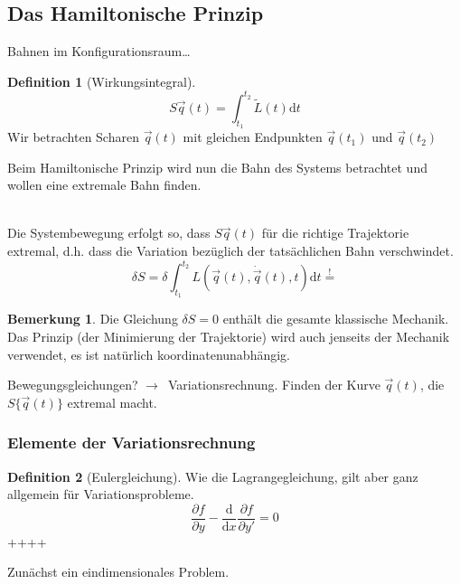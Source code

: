 \documentclass[oneside]{book}
\theoremstyle{definition}
\newtheorem*{definition*}{Definition}
\newtheorem*{bemerkung*}{Bemerkung}
\newcommand{\conseq}{$\rightarrow$~}
\renewcommand{\d}{\mathrm d}
\newcommand{\dd}[1]{\frac{\d}{\d #1}}
\newcommand{\ffpartial}[2]{\frac{\partial #1}{\partial #2}}
\newcommand{\dotvec}[1]{\dot{\vec{#1}}}
\begin{document}
\subsection{Das Hamiltonische Prinzip}	
Bahnen im Konfigurationsraum\dots

\begin{definition*}[Wirkungsintegral]
	$$S{ \vec{q}(t) } = \int_{t_1}^{t_2} \tilde{L}(t) \d t$$
	Wir betrachten Scharen $\vec{q}(t)$ mit gleichen Endpunkten $\vec{q}(t_1)$ und $\vec{q}(t_2)$	
\end{definition*}


Beim Hamiltonische Prinzip wird nun die Bahn des Systems betrachtet und wollen eine extremale Bahn finden.

~\\
Die Systembewegung erfolgt so, dass $S{\vec{q}(t)}$ für die richtige Trajektorie extremal, d.h. dass die Variation bezüglich der tatsächlichen Bahn verschwindet.
$$\delta S = \delta \int_{t_1}^{t_2} L(\vec{q}(t), \dotvec{q}(t), t) \d t \overset{!}{=}$$

\begin{bemerkung*}
	Die Gleichung $\delta S = 0$ enthält die gesamte klassische Mechanik. Das Prinzip (der Minimierung der Trajektorie) wird auch jenseits der Mechanik verwendet, es ist natürlich koordinatenunabhängig.
\end{bemerkung*}

Bewegungsgleichungen? \conseq Variationsrechnung.
Finden der Kurve $\vec{q}(t)$, die $S\{\vec{q}(t)\}$ extremal macht.

\subsubsection{Elemente der Variationsrechnung}

\begin{definition*}[Eulergleichung]
	Wie die Lagrangegleichung, gilt aber ganz allgemein für Variationsprobleme.
	$$ \ffpartial{f}{y} - \dd x \ffpartial{f}{y'} = 0$$++++
\end{definition*}

Zunächst ein eindimensionales Problem.
\end{document}
